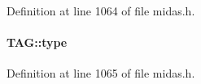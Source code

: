 \begin{DoxyItemize}
\item 
\end{DoxyItemize}

Definition at line 1064 of file midas.h.
\paragraph[{type}]{ {\bf TAG::type}}\hfill\label{structTAG_a3fdedadca645679ef114cc651a978d17}

\begin{DoxyItemize}
\item 
\end{DoxyItemize}

Definition at line 1065 of file midas.h.